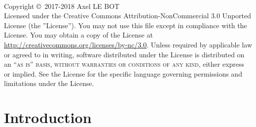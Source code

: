 \documentclass[12pt,a4paper]{book} %
\begin{document}

\newpage
~\vfill
\thispagestyle{empty}

\noindent Copyright \copyright\ 2017-2018 Axel LE BOT \\ %

\noindent Licensed under the Creative Commons Attribution-NonCommercial 3.0 Unported License (the ''License''). You may not use this file except in compliance with the License. You may obtain a copy of the License at \url{http://creativecommons.org/licenses/by-nc/3.0}. Unless required by applicable law or agreed to in writing, software distributed under the License is distributed on an \textsc{``as is'' basis, without warranties or conditions of any kind}, either express or implied. See the License for the specific language governing permissions and limitations under the License.\\ %


\pagestyle{empty} %


\chapter*{Introduction}
\end{document}
